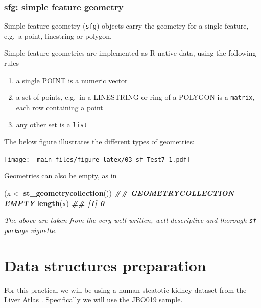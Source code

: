 \documentclass[
]{book}
\newenvironment{Shaded}{\begin{snugshade}}{\end{snugshade}}
\newcommand{\DocumentationTok}[1]{\textcolor[rgb]{0.56,0.35,0.01}{\textbf{\textit{#1}}}}
\newcommand{\FunctionTok}[1]{\textcolor[rgb]{0.13,0.29,0.53}{\textbf{#1}}}
\newcommand{\NormalTok}[1]{#1}
\newcommand{\OtherTok}[1]{\textcolor[rgb]{0.56,0.35,0.01}{#1}}
\providecommand{\tightlist}{%
  \setlength{\itemsep}{0pt}\setlength{\parskip}{0pt}}
\begin{document}
\hypertarget{sfg-simple-feature-geometry}{%
\subsubsection{sfg: simple feature geometry}\label{sfg-simple-feature-geometry}}

Simple feature geometry (\texttt{sfg}) objects carry the geometry for a single feature, e.g.~a point, linestring or polygon.

Simple feature geometries are implemented as R native data, using the following rules

\begin{enumerate}
\def\labelenumi{\arabic{enumi}.}
\tightlist
\item
  a single POINT is a numeric vector
\item
  a set of points, e.g.~in a LINESTRING or ring of a POLYGON is a \texttt{matrix}, each row containing a point
\item
  any other set is a \texttt{list}
\end{enumerate}

The below figure illustrates the different types of geometries:

\texttt{[image: \_main\_files/figure-latex/03\_sf\_Test7-1.pdf]}

Geometries can also be empty, as in

\begin{Shaded}
\begin{Highlighting}[]
\NormalTok{(x }\OtherTok{\textless{}{-}} \FunctionTok{st\_geometrycollection}\NormalTok{())}
\DocumentationTok{\#\# GEOMETRYCOLLECTION EMPTY}
\FunctionTok{length}\NormalTok{(x)}
\DocumentationTok{\#\# [1] 0}
\end{Highlighting}
\end{Shaded}

\emph{The above are taken from the very well written, well-descriptive and thorough \texttt{sf} package \href{https://cran.r-project.org/web/packages/sf/vignettes/sf1.html}{vignette}.}

\hypertarget{data-structures-preparation}{%
\section{Data structures preparation}\label{data-structures-preparation}}

For this practical we will be using a human steatotic kidney dataset from the \href{https://livercellatlas.org/index.php}{Liver Atlas} \citep{GUILLIAMS2022379}. Specifically we will use the JBO019 sample.
\end{document}
